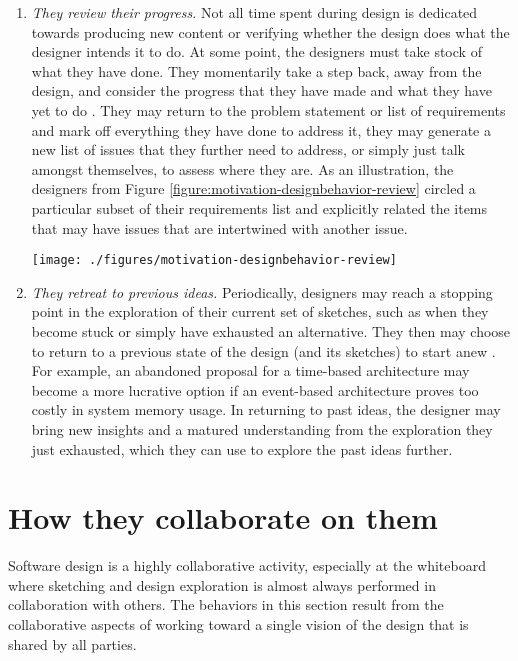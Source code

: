 \begin{enumerate}
 \item \emph{They review their progress.} Not all time spent during design is dedicated towards producing new content or verifying whether the design does what the designer intends it to do. At some point, the designers must take stock of what they have done. They momentarily take a step back, away from the design, and consider the progress that they have made and what they have yet to do \cite{mangano2012design}. They may return to the problem statement or list of requirements and mark off everything they have done to address it, they may generate a new list of issues that they further need to address, or simply just talk amongst themselves, to assess where they are. As an illustration, the designers from Figure \ref{figure:motivation-designbehavior-review} circled a particular subset of their requirements list and explicitly related the items that may have issues that are intertwined with another issue.
 
 \begin{figure*}[tbh]
  \centering
  \texttt{[image: ./figures/motivation-designbehavior-review]}
  \caption{While reviewing progressing, designs may mark up their requirement lists.}
  \label{figure:motivation-designbehavior-review}
\end{figure*} 
 
 \item \emph{They retreat to previous ideas.} Periodically, designers may reach a stopping point in the exploration of their current set of sketches, such as when they become stuck or simply have exhausted an alternative. They then may choose to return to a previous state of the design (and its sketches) to start anew \cite{zannier2007model}. For example, an abandoned proposal for a time-based architecture may become a more lucrative option if an event-based architecture proves too costly in system memory usage. In returning to past ideas, the designer may bring new insights and a matured understanding from the exploration they just exhausted, which they can use to explore the past ideas further.
 \end{enumerate}

\section{How they collaborate on them}

Software design is a highly collaborative activity, especially at the whiteboard where sketching and design exploration is almost always performed in collaboration with others. The behaviors in this section result from the collaborative aspects of working toward a single vision of the design that is shared by all parties.

